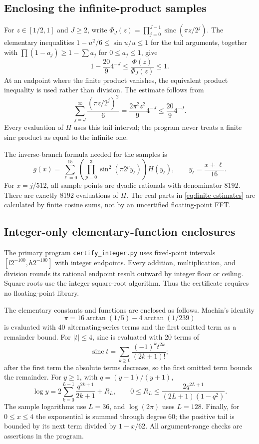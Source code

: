 \documentclass[11pt,a4paper]{article}
\theoremstyle{definition}
\theoremstyle{remark}
\newcommand{\sinc}{\operatorname{sinc}}
\numberwithin{equation}{section}
\begin{document}
\subsection{Enclosing the infinite-product samples}
For $z\in[1/2,1]$ and $J\ge2$, write
$\Phi_J(z)=\prod_{j=0}^{J-1}\sinc(\pi z/2^j)$. The elementary inequalities
$1-u^2/6\le\sin u/u\le1$ for the tail arguments, together with
$\prod(1-a_j)\ge1-\sum a_j$ for $0\le a_j\le1$, give
\begin{equation}
 1-\frac{20}{9}4^{-J}
 \le \frac{\Phi(z)}{\Phi_J(z)}\le1.
 \label{eq:sinctail}
\end{equation}
At an endpoint where the finite product vanishes, the equivalent product
inequality is used rather than division. The estimate follows from
\[
 \sum_{j=J}^\infty\frac{(\pi z/2^j)^2}{6}
 =\frac{2\pi^2z^2}{9}4^{-J}
 \le\frac{20}{9}4^{-J}.
\]
Every evaluation of $H$ uses this tail interval; the program never treats a
finite sinc product as equal to the infinite one.

The inverse-branch formula needed for the samples is
\begin{equation}
 g(x)=\sum_{\ell=0}^{15}
 \left(\prod_{p=0}^3\sin^2(\pi2^py_\ell)\right)H(y_\ell),
 \qquad y_\ell=\frac{x+\ell}{16}.
 \label{eq:g-samples}
\end{equation}
For $x=j/512$, all sample points are dyadic rationals with denominator
$8192$. There are exactly $8192$ evaluations of $H$.
The real parts in \cref{eq:finite-estimates} are calculated by finite cosine
sums, not by an uncertified floating-point FFT.

\subsection{Integer-only elementary-function enclosures}
The primary program \texttt{certify\_integer.py} uses fixed-point intervals
$[l2^{-100},h2^{-100}]$ with integer endpoints. Every addition, multiplication,
and division rounds its rational endpoint result outward by integer floor
or ceiling. Square roots use the integer square-root algorithm. Thus the
certificate requires no floating-point library.

The elementary constants and functions are enclosed as follows. Machin's
identity
\[
 \pi=16\arctan(1/5)-4\arctan(1/239)
\]
is evaluated with 40 alternating-series terms and the first omitted term as
a remainder bound. For $|t|\le4$, sinc is evaluated with 20 terms of
\[
 \sinc t=\sum_{k\ge0}\frac{(-1)^kt^{2k}}{(2k+1)!};
\]
after the first term the absolute terms decrease, so the first omitted term
bounds the remainder. For $y\ge1$, with $q=(y-1)/(y+1)$,
\[
 \log y=2\sum_{k=0}^{L-1}\frac{q^{2k+1}}{2k+1}+R_L,
 \qquad 0\le R_L\le
 \frac{2q^{2L+1}}{(2L+1)(1-q^2)}.
\]
The sample logarithms use $L=36$, and $\log(2\pi)$ uses $L=128$.
Finally, for $0\le x\le4$ the exponential is summed through degree 60;
the positive tail is bounded by its next term divided by $1-x/62$.
All argument-range checks are assertions in the program.
\end{document}
